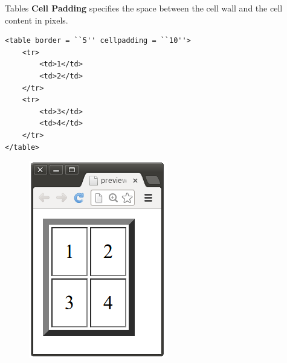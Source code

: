 \documentclass[14pt]{beamer}
\begin{document}
\begin{frame}[fragile]{Tables}
\textbf{Cell Padding} specifies the space between the cell wall and the cell content in pixels.

\begin{minipage}{7cm}
\begin{lstlisting}
<table border = ``5'' cellpadding = ``10''>
    <tr>
        <td>1</td>
        <td>2</td>
    </tr>
    <tr>
        <td>3</td>
        <td>4</td>
    </tr>
</table>
\end{lstlisting}
\end{minipage}
\quad
\begin{minipage}{2cm}
\begin{figure}[H]
 \includegraphics[scale=.3]{tables-cell-padding.png}
\end{figure}
\end{minipage}
\end{frame}
\end{document}
